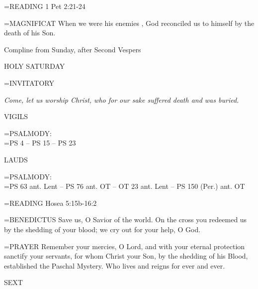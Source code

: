 \hangindent=\parindent \small{READING}    1 Pet 2:21-24 \textbf{   \\}

\hangindent=\parindent \small{MAGNIFICAT 	When we were his enemies , God reconciled us to himself by the death of his Son.\\}

Compline from Sunday, after Second Vespers

\begin{center}
\normalsize HOLY SATURDAY
\end{center}

\hangindent=\parindent \small{INVITATORY}
\begin{center}
\textit{Come, let us worship Christ, who for our sake suffered death and was buried.\\}
\end{center}

\begin{flushleft}\normalsize VIGILS\\\end{flushleft}

\hangindent=\parindent \small{PSALMODY:}\\
\hangindent=\parindent  PS 4 -- PS 15 -- PS 23\vspace{0.5em}

\begin{flushleft}\normalsize LAUDS\\\end{flushleft}

\hangindent=\parindent \small{PSALMODY:}\\
\hangindent=\parindent  PS 63 ant. Lent -- PS 76 ant. OT -- OT 23 ant. Lent -- PS 150 (Per.) ant. OT\vspace{0.5em}

\hangindent=\parindent \small{READING}    Hosea 5:15b-16:2 \textbf{   \\}

\hangindent=\parindent \small{BENEDICTUS 	Save us, O Savior of the world. On the cross you redeemed us by the shedding of your blood; we cry out for your help, O God.\\}

\hangindent=\parindent \small{PRAYER 	Remember your mercies, O Lord, and with your eternal protection sanctify your servants, for whom Christ your Son, by the shedding of his Blood, established the Paschal Mystery. Who lives and reigns for ever and ever.}

\begin{flushleft}\normalsize SEXT\\\end{flushleft}

